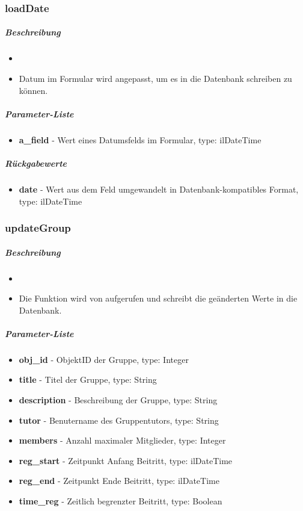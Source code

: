 \subsubsection*{loadDate}\label{loadDateGDGUI}
\subparagraph{Beschreibung}
\begin{itemize}
	\item[] \noindent{}
	\item[] Datum im Formular wird angepasst, um es in die Datenbank schreiben zu können.
\end{itemize}
\subparagraph{Parameter-Liste}
\begin{itemize}
	\item[] \textbf{a\_field} - Wert eines Datumsfelds im Formular, type: ilDateTime
\end{itemize}
\subparagraph{Rückgabewerte}
\begin{itemize}
	\item[] \textbf{date} - Wert aus dem Feld umgewandelt in Datenbank-kompatibles Format, type: ilDateTime
\end{itemize}

\subsubsection*{updateGroup}\label{updateGroupGDGUI}
\subparagraph{Beschreibung}
\begin{itemize}
	\item[]  \noindent{} 
	\item[] Die Funktion wird von  aufgerufen und schreibt die geänderten Werte in die Datenbank.
\end{itemize}
\subparagraph{Parameter-Liste}
\begin{itemize}
	\item[] \textbf{obj\_id} - ObjektID der Gruppe, type: Integer
	\item[] \textbf{title} - Titel der Gruppe, type: String
	\item[] \textbf{description} - Beschreibung der Gruppe, type: String
	\item[] \textbf{tutor} - Benutername des Gruppentutors, type: String
	\item[] \textbf{members} - Anzahl maximaler Mitglieder, type: Integer
	\item[] \textbf{reg\_start} - Zeitpunkt Anfang Beitritt, type: ilDateTime
	\item[] \textbf{reg\_end} - Zeitpunkt Ende Beitritt, type: ilDateTime
	\item[] \textbf{time\_reg} - Zeitlich begrenzter Beitritt, type: Boolean
\end{itemize}

